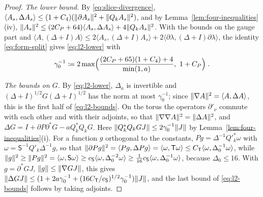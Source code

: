 \documentclass[11pt]{preprint}
\DeclarePairedDelimiter{\norm}{\lVert}{\rVert}
\numberwithin{equation}{section}
\theoremstyle{definition}
\theoremstyle{remark}
\theoremstyle{plain}
\begin{document}
\begin{proof}
\emph{The lower bound.} By \eqref{eq:slice-divergence}, $\langle A_s, \Delta A_s\rangle \leq (1 + C_4)(\norm{\partial A_s}^2 + \norm{Q_kA_s}^2)$, and by Lemma~\ref{lem:four-inequalities}(iv), $\norm{A_s}^2 \leq (2C_P + 64)\langle A_s, \Delta A_s\rangle + 4\norm{Q_kA_s}^2$. With the bounds on the gauge part and $\langle A, (\Delta + I)A\rangle \leq 2\langle A_s, (\Delta + I)A_s\rangle + 2\langle\partial\lambda, (\Delta + I)\partial\lambda\rangle$, the identity \eqref{eq:form-split} gives \eqref{eq:l2-lower} with
\begin{equation}\label{eq:gamma-zero}
    \gamma_0^{-1} \coloneqq 2\max\Bigl(\frac{(2C_P + 65)(1 + C_4) + 4}{\min(1, a)},\ 1 + C_P\Bigr)\;.
\end{equation}

\emph{The bounds on $G$.} By \eqref{eq:l2-lower}, $\Delta_a$ is invertible and $(\Delta + I)^{1/2}G(\Delta + I)^{1/2}$ has the norm at most $\gamma_0^{-1}$; since $\norm{\nabla A}^2 = \langle A, \Delta A\rangle$, this is the first half of \eqref{eq:l2-bounds}. On the torus the operators $\partial'_\nu$ commute with each other and with their adjoints, so that $\norm{\nabla\nabla A}^2 = \norm{\Delta A}^2$, and $\Delta G = I + \partial P\partial^*G - aQ_k^*Q_kG$. Here $\norm{Q_k^*Q_kGJ} \leq 2\gamma_0^{-1}\norm{J}$ by Lemma~\ref{lem:four-inequalities}(i). For a function $g$ orthogonal to the constants, $Pg = \Delta^{-1}Q'^*_k\omega$ with $\omega = \mathsf S^{-1}Q'_k\Delta^{-1}g$, so that $\norm{\partial Pg}^2 = \langle Pg, \Delta Pg\rangle = \langle\omega, \mathsf T\omega\rangle \leq C_{\mathsf T}\langle\omega, \Delta_0^{-1}\omega\rangle$, while $\norm{g}^2 \geq \norm{Pg}^2 = \langle\omega, \mathsf S\omega\rangle \geq c_{\mathsf S}\langle\omega, \Delta_0^{-2}\omega\rangle \geq \frac{1}{16}c_{\mathsf S}\langle\omega, \Delta_0^{-1}\omega\rangle$, because $\Delta_0 \leq 16$. With $g = \partial^*GJ$, $\norm{g} \leq \norm{\nabla GJ}$, this gives $\norm{\Delta GJ} \leq (1 + 2a\gamma_0^{-1} + (16C_{\mathsf T}/c_{\mathsf S})^{1/2}\gamma_0^{-1})\norm{J}$, and the last bound of \eqref{eq:l2-bounds} follows by taking adjoints.


\end{proof}
\end{document}
